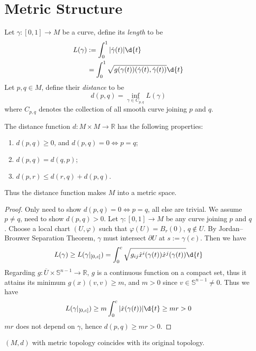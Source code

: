 \section{Metric Structure}

\begin{defn}
    Let $\gamma:[0,1]\to M$ be a curve, define its \emph{length} to be
    \begin{align*}
        L(\gamma)&:=\int_0^1|\dot{\gamma}(t)|\d{t}\\
        &=\int_0^1\sqrt{g(\gamma(t))(\dot{\gamma}(t),\dot{\gamma}(t))}\d{t}
    \end{align*}
    Let $p,q\in M$, define their \emph{distance} to be
    \[d(p,q)=\inf_{\gamma\in C_{p,q}}L(\gamma)\]
    where $C_{p,q}$ denotes the collection of all smooth curve joining $p$ and $q$.
\end{defn}

\begin{prop}
    The distance function $d:M\times M\to\mathbb{R}$ has the following properties:
    \begin{enumerate}[(1)]
        \item $d(p,q)\geq 0$, and $d(p,q)=0\iff p=q$;
        \item $d(p,q)=d(q,p)$;
        \item $d(p,r)\leq d(r,q)+d(p,q)$.
    \end{enumerate}
    Thus the distance function makes $M$ into a metric space.
\end{prop}
\begin{proof}
    Only need to show $d(p,q)=0\iff p=q$, all else are trivial.
    We assume $p\neq q$, need to show $d(p,q)>0$.
    Let $\gamma:[0,1]\to M$ be any curve joining $p$ and $q$.
    Choose a local chart $(U,\varphi)$ such that $\varphi(U)=B_r(0)$, $q\notin U$.
    By Jordan--Brouwer Separation Theorem, $\gamma$ must intersect $\partial{U}$ at $s:=\gamma(c)$.
    Then we have
    \[L(\gamma)\geq L(\gamma|_{[0,c]})=\int_0^c\sqrt{g_{ij}\dot{x}^i(\gamma(t))\dot{x}^j(\gamma(t))}\d{t}\]
    Regarding $g:\overline{U}\times\mathbb{S}^{n-1}\to\mathbb{R}$, $g$ is a continuous function on a compact set, thus it attains its minimum $g(x)(v,v)\geq m$, and $m>0$ since $v\in\mathbb{S}^{n-1}\neq 0$.
    Thus we have
    \[L(\gamma|_{[0,c]})\geq m\int_0^c|\dot{x}(\gamma(t))|\d{t}\geq mr>0\]
    $mr$ does not depend on $\gamma$, hence $d(p,q)\geq mr>0$.
\end{proof}

\begin{prop}
    $(M,d)$ with metric topology coincides with its original topology.
\end{prop}

